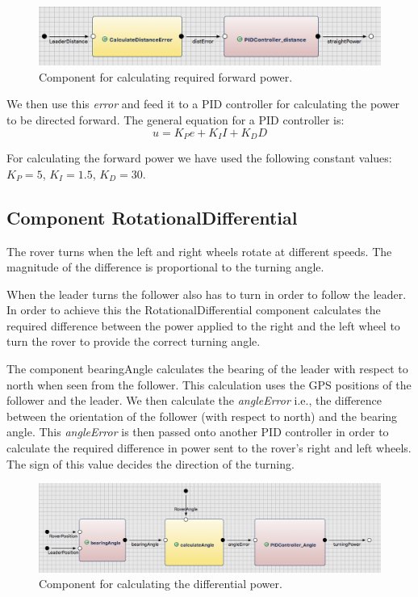 \begin{figure}[!h]
	\centering
	\includegraphics[width=1\textwidth]{images/straight.png}
	\caption{Component for calculating required forward power.}
	\label{fig:straight}
\end{figure}


We then use this \textit{error} and feed it to a PID controller for calculating
the power to be directed forward. The general equation for a PID controller
is:
\begin{equation}
u = K_Pe + K_II + K_DD
\label{formula:pidController}
\end{equation}

For calculating the forward power we have used the following constant values: $K_P = 5$, $K_I=1.5$, $K_D=30$.

\subsection{Component RotationalDifferential}

The rover turns when the left and right wheels rotate at different speeds. The
magnitude of the difference is proportional to the turning angle.

When the leader turns the follower also has to turn in order to follow the
leader. In order to achieve this the \textsf{RotationalDifferential} component
calculates the required difference between the power applied to the right and
the left wheel to turn the rover to provide the correct turning angle.

The component \textsf{bearingAngle} calculates the bearing of the leader with
respect to north when seen from the follower. This calculation uses the GPS
positions of the follower and the leader. We then calculate the
\textit{angleError} i.e., the difference between the orientation of the follower
(with respect to north) and the bearing angle. This
\textit{angleError} is then passed onto another PID controller in order to
calculate the required difference in power sent to the rover's right and left
wheels. The sign of this value decides the direction of the turning.

\begin{figure}[!h]
	\centering
	\includegraphics[width=1\textwidth]{images/rotation.png}
	\caption{Component for calculating the differential power.}
	\label{fig:rotation}
\end{figure}


